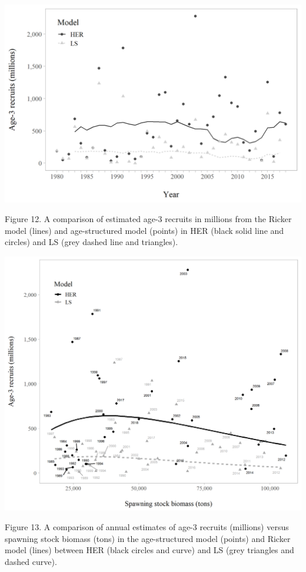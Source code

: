 \documentclass[]{article}
\begin{document}
\includegraphics[width=1\linewidth]{../../HER/figs/compare_recruit_plot}

Figure 12. A comparison of estimated age-3 recruits in millions from the
Ricker model (lines) and age-structured model (points) in HER (black
solid line and circles) and LS (grey dashed line and triangles).

\includegraphics[width=1\linewidth]{../../HER/figs/compare_srcurves}

Figure 13. A comparison of annual estimates of age-3 recruits (millions)
versus spawning stock biomass (tons) in the age-structured model
(points) and Ricker model (lines) between HER (black circles and curve)
and LS (grey triangles and dashed curve).
\end{document}
